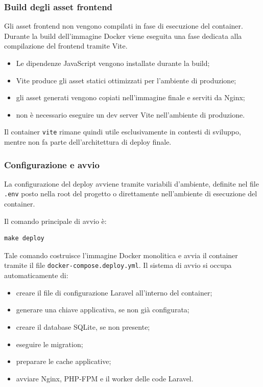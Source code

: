 \documentclass[a4paper,10pt]{article}
\begin{document}
\subsubsection{Build degli asset frontend}
Gli asset frontend non vengono compilati in fase di esecuzione del container. Durante la build dell'immagine Docker viene eseguita una fase dedicata alla compilazione del frontend tramite Vite.

\begin{itemize}
    \item Le dipendenze JavaScript vengono installate durante la build;
    \item Vite produce gli asset statici ottimizzati per l'ambiente di produzione;
    \item gli asset generati vengono copiati nell'immagine finale e serviti da Nginx;
    \item non è necessario eseguire un dev server Vite nell'ambiente di produzione.
\end{itemize}

Il container \texttt{vite} rimane quindi utile esclusivamente in contesti di sviluppo, mentre non fa parte dell'architettura di deploy finale.

\subsubsection{Configurazione e avvio}
La configurazione del deploy avviene tramite variabili d'ambiente, definite nel file \texttt{.env} posto nella root del progetto o direttamente nell'ambiente di esecuzione del container.

Il comando principale di avvio è:

\begin{lstlisting}
make deploy
\end{lstlisting}

Tale comando costruisce l'immagine Docker monolitica e avvia il container tramite il file \texttt{docker-compose.deploy.yml}. Il sistema di avvio si occupa automaticamente di:

\begin{itemize}
    \item creare il file di configurazione Laravel all'interno del container;
    \item generare una chiave applicativa, se non già configurata;
    \item creare il database SQLite, se non presente;
    \item eseguire le migration;
    \item preparare le cache applicative;
    \item avviare Nginx, PHP-FPM e il worker delle code Laravel.
\end{itemize}
\end{document}
